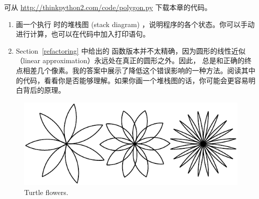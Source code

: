 \begin{exercise}


可从 \href{http://thinkpython2.com/code/polygon.py}{http://thinkpython2.com/code/polygon.py} 下载本章的代码。


\begin{enumerate}

\item 画一个执行 {\em {}} 时的堆栈图 (stack diagram) ，说明程序的各个状态。你可以手动进行计算，也可以在代码中加入打印语句。

\item Section~\ref{refactoring} 中给出的  函数版本并不太精确，因为圆形的线性近似（linear approximation）永远处在真正的圆形之外。因此， 总是和正确的终点相差几个像素。我的答案中展示了降低这个错误影响的一种方法。阅读其中的代码，看看你是否能够理解。如果你画一个堆栈图的话，你可能会更容易明白背后的原理。

\end{enumerate}

\end{exercise}


\begin{figure}
\centerline
{\includegraphics[scale=0.8]{../source/figs/flowers.pdf}}
\caption{Turtle flowers.}
\label{fig.flowers}
\end{figure}


